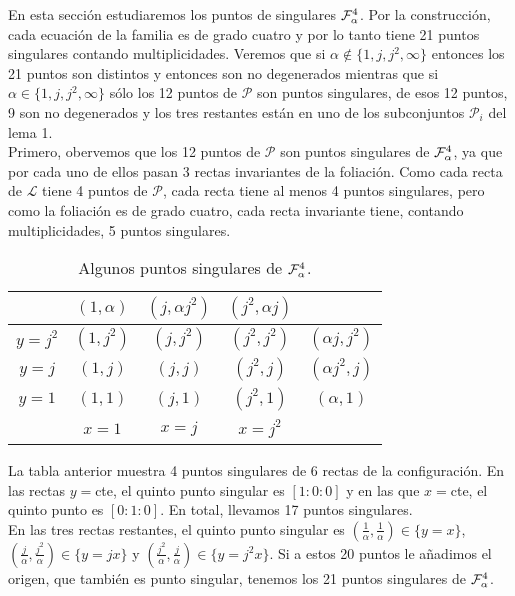 En esta sección estudiaremos los puntos de singulares $\Fol[4]{\alpha}$. Por la construcción, cada ecuación de la familia es de grado cuatro y por lo tanto tiene 21 puntos singulares contando multiplicidades. Veremos que si $\alpha\notin \{1,j,j^{2},\infty \}$ entonces los 21 puntos son distintos y entonces son no degenerados mientras que si  $\alpha\in \{1,j,j^{2},\infty \}$ sólo los 12 puntos de $\mathcal{P}$ son puntos singulares, de esos 12 puntos, 9 son no degenerados y los tres restantes están en uno de los subconjuntos $\mathcal{P}_{i}$ del lema 1.
\\

Primero, obervemos que los 12 puntos de $\mathcal{P}$ son puntos singulares de $\Fol[4]{\alpha}$, ya que por cada uno de ellos pasan 3 rectas invariantes de la foliación. Como cada recta de $\mathcal{L}$ tiene 4 puntos de $\mathcal{P}$, cada recta tiene al menos 4 puntos singulares, pero como la foliación es de grado cuatro, cada recta invariante tiene, contando multiplicidades, 5 puntos singulares.\\


\begin{table}[h]
\begin{center}
  \begin{tabular}{c|c|c|c|c}
    \ & $(1,\alpha)$ & $(j,\alpha j^{2})$ & $(j^{2},\alpha j)$ & \  \\ \hline 
    $y=j^{2}$ & $(1,j^{2})$ & $(j,j^{2})$ & $(j^{2},j^{2})$ & $(\alpha j,j^{2})$ \\ \hline 
    $y=j$ & $(1,j)$ & $(j,j)$ & $(j^{2},j)$ & $(\alpha j^{2},j)$ \\ \hline 
    $y=1$ & $(1,1)$ & $(j,1)$ & $(j^{2},1)$ & $(\alpha ,1)$ \\ \hline 
    \ & $x=1$ & $x=j$ & $x=j^{2}$ & \ \\
  \end{tabular}
  \caption{Algunos puntos singulares de $\Fol[4]{\alpha}$.}
  \label{Tab:PuntSingGrad4}
\end{center}  
\end{table}


La tabla anterior muestra 4 puntos singulares de 6 rectas de la configuración. En las rectas $y=$cte, el quinto punto singular es $[1 : 0 : 0]$ y en las que $x=$cte, el quinto punto es $[0 : 1 : 0]$. En total, llevamos 17 puntos singulares.
\\

En las tres rectas restantes, el quinto punto singular es $(\frac{1}{\alpha},\frac{1}{\alpha})\in\{ y=x \}$, $(\frac{j}{\alpha}, \frac{j^{2}}{\alpha})\in\{ y=jx \}$ y $(\frac{j^{2}}{\alpha}, \frac{j}{\alpha})\in\{ y=j^{2}x \}$. Si a estos 20 puntos le añadimos el origen, que también es punto singular, tenemos los 21 puntos singulares de $\Fol[4]{\alpha}$.\\

